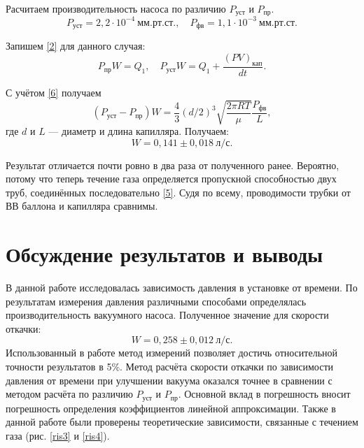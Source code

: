 \documentclass[a4paper, 12pt]{article}
\begin{document}
Расчитаем производительность насоса по различию $P_{уст}$ и $P_{пр}$. $$P_{уст} = 2,2 \cdot 10^{-4}~мм. рт. ст., \quad P_{фв} = 1,1 \cdot 10^{-3}~мм. рт. ст.$$

Запишем \eqref{2} для данного случая:
$$P_\text{пр}W = Q_1, \quad P_\text{уст}W = Q_1 + \frac{(PV)_{кап}}{dt}.$$

С учётом \eqref{6} получаем
$$(P_\text{уст} - P_\text{пр})W = \frac{4}{3}(d/2)^3\sqrt{\frac{2\pi RT}{\mu}}\frac{P_\text{фв}}{L},$$
где $d$ и $L$ --- диаметр и длина капилляра.
Получаем:
\[\boxed{W = 0,141\pm0,018~л/с}.\]

Результат отличается почти ровно в два раза от полученного ранее. Вероятно, потому что теперь течение газа определяется пропускной способностью двух труб, соединённых последовательно \eqref{5}. Судя по всему, проводимости трубки от ВВ баллона и капилляра сравнимы.

\section{Обсуждение результатов и выводы}

В данной работе исследовалась зависимость давления в установке от времени. По результатам измерения давления различными способами определялась производительность вакуумного насоса. Полученное значение для скорости откачки:
\[\boxed{W = 0,258\pm0,012~л/с}.\]
Использованный в работе метод измерений позволяет достичь относительной точности результатов в 5\%. Метод расчёта скорости откачки по зависимости давления от времени при улучшении вакуума оказался точнее в сравнении с методом расчёта по различию $P_{уст}$ и $P_{пр}$. Основной вклад в погрешность вносит погрешность определения коэффициентов линейной аппроксимации.
Также в данной работе были проверены теоретические зависимости, связанные с течением газа (рис. \ref{ris3} и \ref{ris4}).
\end{document}
